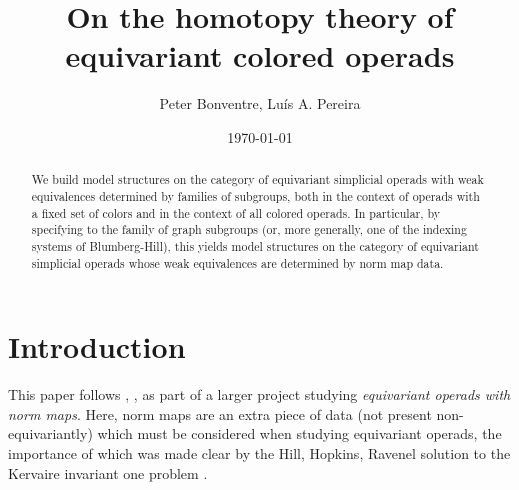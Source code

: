 \documentclass[a4paper,10pt
,draft
]{article}%
\title{On the homotopy theory of equivariant colored operads}
\author{Peter Bonventre, Lu\'is A. Pereira}%
\date{\today}
\numberwithin{equation}{section}
\numberwithin{figure}{section}
\theoremstyle{definition} %
\newcommand{\1}{\ensuremath{\mathbbm 1}}%
\begin{document}
\maketitle

\begin{abstract}
	We build model structures 
	on the category of equivariant simplicial operads
	with weak equivalences determined by families of subgroups,
	both in the context of operads with a fixed set of colors and in the context of all colored operads.
	In particular, by specifying to the family of graph subgroups 
	(or, more generally, one of the indexing systems of Blumberg-Hill),
	this yields model structures on the category of equivariant simplicial operads
	whose weak equivalences are determined by norm map data.
\end{abstract}



\tableofcontents







\section{Introduction}

This paper follows \cite{Per18}, \cite{BP_geo}, \cite{BP_edss}
as part of a larger project studying 
\emph{equivariant operads with norm maps}.
Here, norm maps are an extra piece of data 
(not present non-equivariantly)
which must be considered
when studying equivariant operads,
the importance of which was made clear
by the Hill, Hopkins, Ravenel 
solution to the Kervaire invariant one problem \cite{HHR16}.
\end{document}
